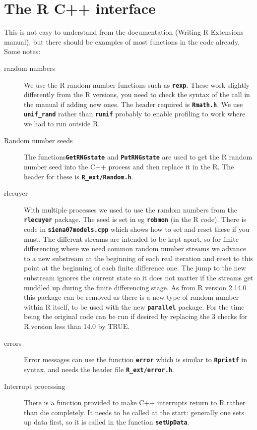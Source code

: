 \documentclass[12pt, a4paper]{article}
\renewcommand{\=}{\,=\,}
\newcommand{\+}{\,+\,}
\newcommand{\sfn}[1]{\textbf{\texttt{#1}}}
\begin{document}
\section{The R C++ interface}
This is not easy to understand from the documentation (Writing R Extensions
manual), but there should be examples of most functions in the code
already. Some notes:
\begin{description}
\item[random numbers]
We use the R random number functions such as \sfn{rexp}. These work slightly
differently from the R versions, you need to check the syntax of the call in
the manual if adding new ones. The header required is \sfn{Rmath.h}. We use
\sfn{unif\_rand} rather than \sfn{runif} probably to enable profiling to
work where we had to run outside R.

\item[Random number seeds] The functions\sfn{GetRNGstate} and
\sfn{PutRNGstate}  are used to get the R random number seed into the C++
process and then replace it in the R. The header for these is
\sfn{R\_ext/Random.h}.
\item[rlecuyer]
With multiple processes we used to use the random numbers from the \sfn{rlecuyer}
package. The seed is set in eg \sfn{robmon} (in the R code). There is code in
\sfn{siena07models.cpp} which shows how to set and reset these if you must. The
different streams are intended to be kept apart, so for finite differencing
where we need common random number streams we advance to a new substream at
the beginning of each real iteration and reset to this point at the beginning of
each finite difference one. The jump to the new substream ignores the current
state so it does not matter if the streams get muddled up during the finite
differencing stage. As from R version 2.14.0 this package can be removed as
there is a new type of random number within R itself, to be used with the
new \sfn{parallel} package. For the time being the original code can be run if
desired by replacing the 3 checks for R.version less than 14.0 by TRUE.
\item[errors]
Error messages can use the function \sfn{error} which is similar to
\sfn{Rprintf} in syntax, and needs the header file \sfn{R\_ext/error.h}.
\item[Interrupt processing] There is a function provided to make C++ interrupts
  return to R rather than die completely. It needs to be called at the start:
  generally one sets up data first, so it is called in the function
  \sfn{setUpData}.
\end{description}
\end{document}
